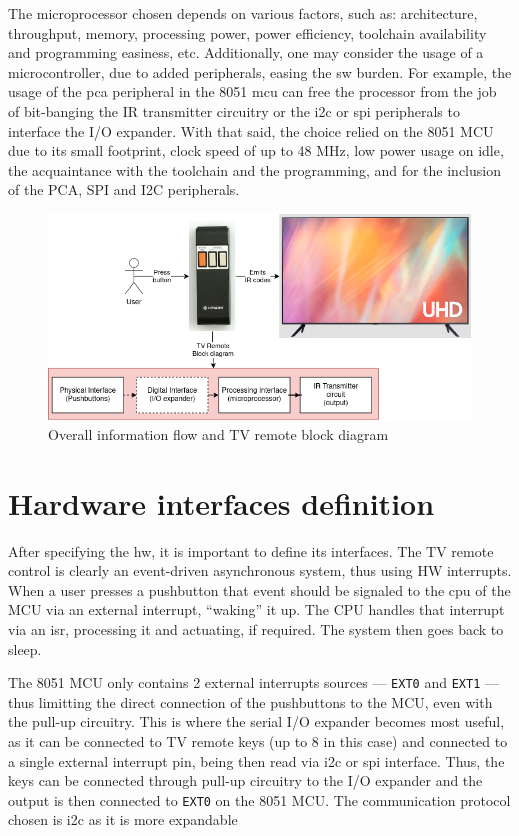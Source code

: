 The microprocessor chosen depends on various factors, such as: architecture,
throughput, memory, processing power, power efficiency, toolchain availability
and programming easiness, etc. Additionally, one may consider the usage of a
microcontroller, due to added peripherals, easing the \gls{sw} burden. For
example, the usage of the \gls{pca} peripheral in the 8051 \gls{mcu} can free the processor from the
job of bit-banging the IR transmitter circuitry or the \gls{i2c} or \gls{spi} peripherals to
interface the I/O expander. With that said, the choice
relied on the 8051 MCU due to its small footprint, clock speed of up to 48 MHz,
low power usage on idle, the acquaintance with the toolchain and the
programming, and for the inclusion of the PCA, SPI and I2C peripherals.  
%
  \vspace{-5mm}
%  
%  
\begin{figure}[htb!]
\centering
    \includegraphics[width=0.7\columnwidth]{./img/block-diagram.png}
  \caption{Overall information flow and TV remote block diagram}%
\label{fig:block-diag}
\end{figure}
%
  \vspace{-5mm}
%  
\section{Hardware interfaces definition}
\label{sec:hw-interf-def}
After specifying the \gls{hw}, it is important to define its interfaces. The
TV remote control is clearly an event-driven asynchronous system, thus using HW
interrupts. When a user presses a pushbutton that event should be signaled to
the \gls{cpu} of the MCU via an external interrupt, ``waking'' it up. The CPU
handles that interrupt via an \gls{isr}, processing it and actuating, if
required. The system then goes back to sleep.

The 8051 MCU only contains 2 external interrupts sources --- \texttt{EXT0} and
\texttt{EXT1} --- thus limitting the direct connection of the pushbuttons to the
MCU, even with the pull-up circuitry. This is where the serial I/O expander
becomes most useful, as it can be connected to TV remote keys (up to 8 in this
case) and connected to a single external interrupt pin, being then read via
\gls{i2c} or \gls{spi} interface. Thus, the keys can be connected through
pull-up circuitry to the I/O expander and the output is then connected to
\texttt{EXT0} on the 8051 MCU. The communication protocol chosen is \gls{i2c} as
it is more expandable

